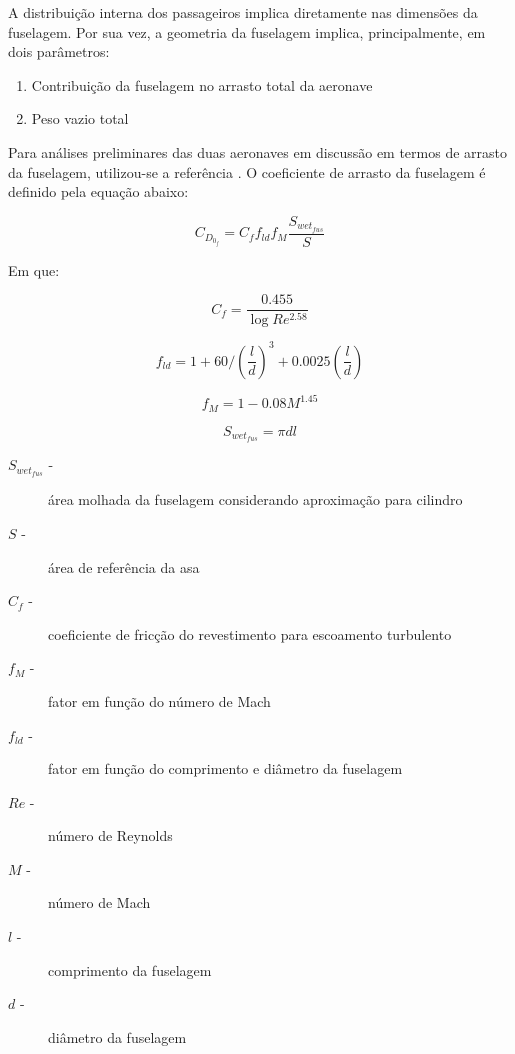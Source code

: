 A distribuição interna dos passageiros implica diretamente nas dimensões da fuselagem.
Por sua vez, a geometria da fuselagem implica, principalmente, em dois parâmetros: 

\begin{enumerate}
	\item Contribuição da fuselagem no arrasto total da aeronave
	\item Peso vazio total
\end{enumerate}

Para análises preliminares das duas aeronaves em discussão em termos de arrasto da fuselagem, utilizou-se a referência \cite{nasatn6800}.
O coeficiente de arrasto da fuselagem é definido pela equação abaixo:

\begin{equation}
C_{D_{0_f}} = C_f f_{ld} f_M \frac{S_{wet_{fus}}}{S}
\end{equation}

Em que:

\begin{equation}
C_{f} = \frac{0.455}{\log{Re^{2.58}}}
\end{equation}

\begin{equation}
f_{ld} =  1 + 60/(\frac{l}{d})^3 + 0.0025(\frac{l}{d})
\end{equation}

\begin{equation}
f_{M} = 1- 0.08M^{1.45}
\end{equation}

\begin{equation}
S_{wet_{fus}} = \pi d l 
\end{equation}

\begin{description}
 \item[$S_{wet_{fus}}$ -]área molhada da fuselagem considerando aproximação para cilindro
 \item[$S$ -]área de referência da asa
 \item[$C_f$ -]coeficiente de fricção do revestimento para escoamento turbulento
 \item[$f_M$ -]fator em função do número de Mach
 \item[$f_{ld}$ -]fator em função do comprimento e diâmetro da fuselagem
 \item[$Re$ -]número de Reynolds
 \item[$M$ -]número de Mach
 \item[$l$ -]comprimento da fuselagem
 \item[$d$ -]diâmetro da fuselagem
\end{description}

